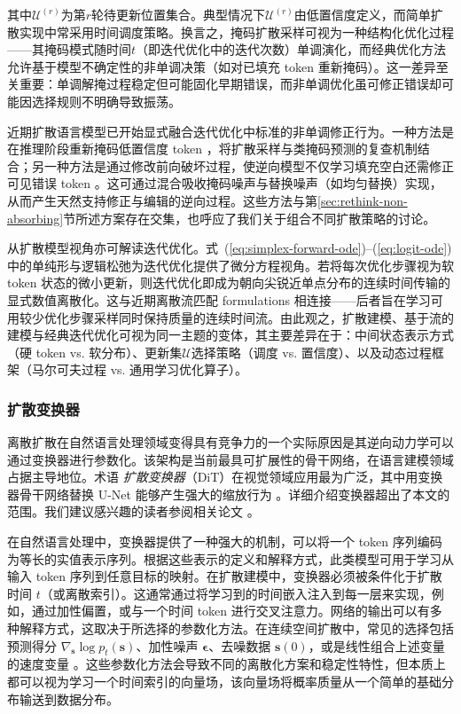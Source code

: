 \noindent 其中$\mathcal{U}^{(r)}$为第$r$轮待更新位置集合。典型情况下$\mathcal{U}^{(r)}$由低置信度定义，而简单扩散实现中常采用时间调度策略。换言之，掩码扩散采样可视为一种结构化优化过程——其掩码模式随时间$t$（即迭代优化中的迭代次数）单调演化，而经典优化方法允许基于模型不确定性的非单调决策（如对已填充 token 重新掩码）。这一差异至关重要：单调解掩过程稳定但可能固化早期错误，而非单调优化虽可修正错误却可能因选择规则不明确导致振荡。

近期扩散语言模型已开始显式融合迭代优化中标准的非单调修正行为。一种方法是在推理阶段重新掩码低置信度 token ，将扩散采样与类掩码预测的复查机制结合\citep{koh-etal:2025conditional,zhang-etal:2025corrective}；另一种方法是通过修改前向破坏过程，使逆向模型不仅学习填充空白还需修正可见错误 token 。这可通过混合吸收掩码噪声与替换噪声（如均匀替换）实现，从而产生天然支持修正与编辑的逆向过程\citep{rutte-etal:2025generalized}。这些方法与第\ref{sec:rethink-non-absorbing}节所述方案存在交集，也呼应了我们关于组合不同扩散策略的讨论。

从扩散模型视角亦可解读迭代优化。式~(\ref{eq:simplex-forward-ode})--(\ref{eq:logit-ode})中的单纯形与逻辑松弛为迭代优化提供了微分方程视角。若将每次优化步骤视为软 token 状态的微小更新，则迭代优化即成为朝向尖锐近单点分布的连续时间传输的显式数值离散化。这与近期离散流匹配 formulations 相连接——后者旨在学习可用较少优化步骤采样同时保持质量的连续时间流\citep{gat-etal:2024discrete,monsefi-etal:2025fs}。由此观之，扩散建模、基于流的建模与经典迭代优化可视为同一主题的变体，其主要差异在于：中间状态表示方式（硬 token vs. 软分布）、更新集$\mathcal{U}$选择策略（调度 vs. 置信度）、以及动态过程框架（马尔可夫过程 vs. 通用学习优化算子）。
\subsubsection{扩散变换器}

离散扩散在自然语言处理领域变得具有竞争力的一个实际原因是其逆向动力学可以通过变换器进行参数化。该架构是当前最具可扩展性的骨干网络，在语言建模领域占据主导地位。术语 \textit{扩散变换器}（DiT）在视觉领域应用最为广泛，其中用变换器骨干网络替换 U-Net 能够产生强大的缩放行为 \citep{peebles-and-xie:2023scalable}。详细介绍变换器超出了本文的范围。我们建议感兴趣的读者参阅相关论文 \citep{vaswani-etal:2017attention,xiao-and-zhu:2023introduction}。

在自然语言处理中，变换器提供了一种强大的机制，可以将一个 token 序列编码为等长的实值表示序列。根据这些表示的定义和解释方式，此类模型可用于学习从输入 token 序列到任意目标的映射。在扩散建模中，变换器必须被条件化于扩散时间 $t$（或离散索引）。这通常通过将学习到的时间嵌入注入到每一层来实现，例如，通过加性偏置，或与一个时间 token 进行交叉注意力。网络的输出可以有多种解释方式，这取决于所选择的参数化方法。在连续空间扩散中，常见的选择包括预测得分 $\nabla_{\mathbf{s}} \log p_t(\mathbf{s})$、加性噪声 $\boldsymbol{\epsilon}$、去噪数据 $\mathbf{s}(0)$，或是线性组合上述变量的速度变量 \citep{ho-eatl:2020denoising,salimans-and-ho:2022progressive}。这些参数化方法会导致不同的离散化方案和稳定性特性，但本质上都可以视为学习一个时间索引的向量场，该向量场将概率质量从一个简单的基础分布输送到数据分布。
